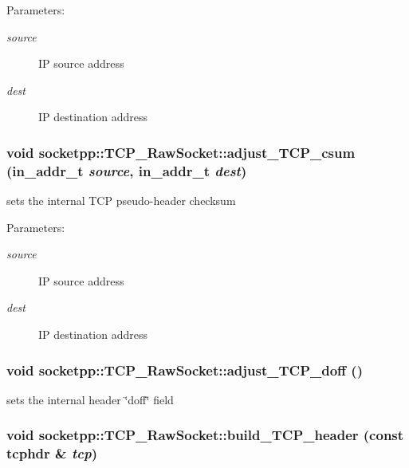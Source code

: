 \begin{Desc}
\item[Parameters:]
\begin{description}
\item[{\em source}]IP source address \item[{\em dest}]IP destination address \end{description}
\end{Desc}
\hypertarget{classsocketpp_1_1TCP__RawSocket_c1a2ef8b2661bb0f3ca3fa6a636b25fd}{
\subsubsection[{adjust\_\-TCP\_\-csum}]{\setlength{\rightskip}{0pt plus 5cm}void socketpp::TCP\_\-RawSocket::adjust\_\-TCP\_\-csum (in\_\-addr\_\-t {\em source}, \/  in\_\-addr\_\-t {\em dest})}}
\label{classsocketpp_1_1TCP__RawSocket_c1a2ef8b2661bb0f3ca3fa6a636b25fd}


sets the internal TCP pseudo-header checksum 

\begin{Desc}
\item[Parameters:]
\begin{description}
\item[{\em source}]IP source address \item[{\em dest}]IP destination address \end{description}
\end{Desc}
\hypertarget{classsocketpp_1_1TCP__RawSocket_029eb8bfbf19531253edf046775d9f5f}{
\subsubsection[{adjust\_\-TCP\_\-doff}]{\setlength{\rightskip}{0pt plus 5cm}void socketpp::TCP\_\-RawSocket::adjust\_\-TCP\_\-doff ()}}
\label{classsocketpp_1_1TCP__RawSocket_029eb8bfbf19531253edf046775d9f5f}


sets the internal header \char`\"{}doff\char`\"{} field 

\hypertarget{classsocketpp_1_1TCP__RawSocket_8c35edfc4d8c2fbccf0fe13485dd2ef1}{
\subsubsection[{build\_\-TCP\_\-header}]{\setlength{\rightskip}{0pt plus 5cm}void socketpp::TCP\_\-RawSocket::build\_\-TCP\_\-header (const tcphdr \& {\em tcp})}}
\label{classsocketpp_1_1TCP__RawSocket_8c35edfc4d8c2fbccf0fe13485dd2ef1}


